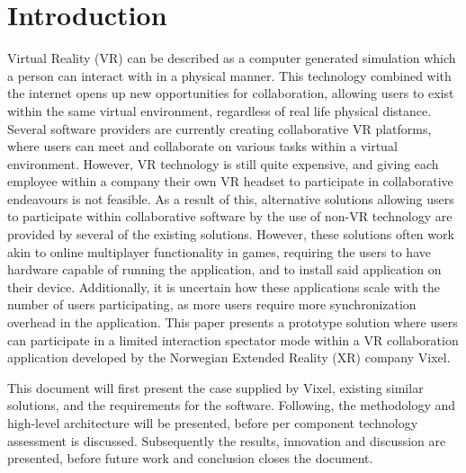 \section{Introduction}
Virtual Reality (VR) can be described as a computer generated simulation which a person can interact with in a physical manner\cite{vr_definition}. This technology combined with the internet opens up new opportunities for collaboration, allowing users to exist within the same virtual environment, regardless of real life physical distance. Several software providers are currently creating collaborative VR platforms, where users can meet and collaborate on various tasks within a virtual environment. However, VR technology is still quite expensive, and giving each employee within a company their own VR headset to participate in collaborative endeavours is not feasible. As a result of this, alternative solutions allowing users to participate within collaborative software by the use of non-VR technology are provided by several of the existing solutions\cite{rumii_vr, insite_vr}. However, these solutions often work akin to online multiplayer functionality in games, requiring the users to have hardware capable of running the application, and to install said application on their device. Additionally, it is uncertain how these applications scale with the number of users participating, as more users require more synchronization overhead in the application. This paper presents a prototype solution where users can participate in a limited interaction spectator mode within a VR collaboration application developed by the Norwegian Extended Reality (XR) company Vixel.

This document will first present the case supplied by Vixel, existing similar solutions, and the requirements for the software. Following, the methodology and high-level architecture will be presented, before per component technology assessment is discussed. Subsequently the results, innovation and discussion are presented, before future work and conclusion closes the document. 
